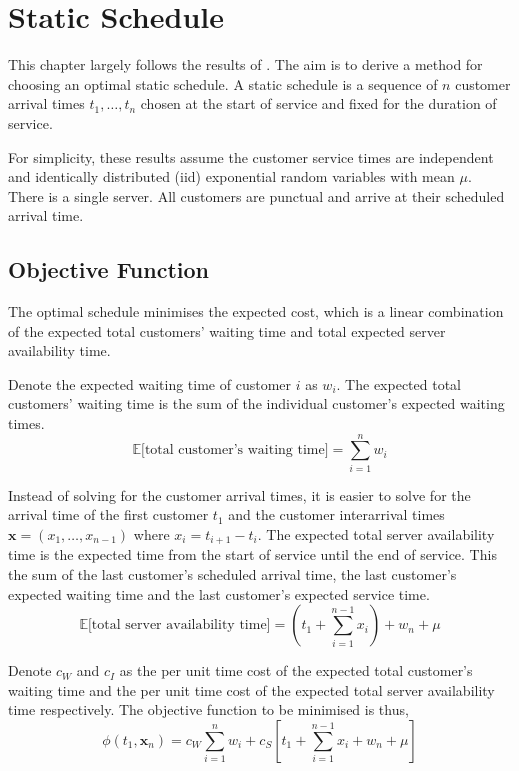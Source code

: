 \chapter{Static Schedule}
\label{chap:Static}
This chapter largely follows the results of \citet{Pegden}. The aim is to derive a method for choosing an optimal static schedule. A static schedule is a sequence of $n$ customer arrival times $t_{1}, \ldots, t_{n}$ chosen at the start of service and fixed for the duration of service. 

For simplicity, these results assume the customer service times are independent and identically distributed (iid) exponential random variables with mean $\mu$. There is a single server. All customers are punctual and arrive at their scheduled arrival time.

\section{Objective Function}
The optimal schedule minimises the expected cost, which is a linear combination of the expected total customers' waiting time and total expected server availability time.

Denote the expected waiting time of customer $i$ as $w_{i}$. The expected total customers' waiting time is the sum of the individual customer's expected waiting times.
\begin{equation}
	\mathbb{E} \Big[\text{total customer's waiting time} \Big] = \sum_{i = 1}^{n} w_{i}
\end{equation}

Instead of solving for the customer arrival times, it is easier to solve for the arrival time of the first customer $t_{1}$ and the customer interarrival times $\mathbf{x} = (x_{1}, \ldots, x_{n - 1})$ where $x_{i} = t_{i + 1} - t_{i}$. The expected total server availability time is the expected time from the start of service until the end of service. This the sum of the last customer's scheduled arrival time, the last customer's expected waiting time and the last customer's expected service time.
\begin{equation}
	\mathbb{E} \Big[\text{total server availability time} \Big] = \left( t_{1} + \sum_{i = 1}^{n - 1} x_{i} \right) + w_{n} + \mu
\end{equation}

Denote $c_{W}$ and $c_{I}$ as the per unit time cost of the expected total customer's waiting time and the per unit time cost of the expected total server availability time respectively. The objective function to be minimised is thus,
\begin{equation}
	\phi (t_{1}, \mathbf{x}_{n}) = c_{W} \sum_{i = 1}^{n} w_{i} + c_{S} \left[ t_{1} + \sum_{i = 1}^{n - 1} x_{i} + w_{n} + \mu \right]
\end{equation}

